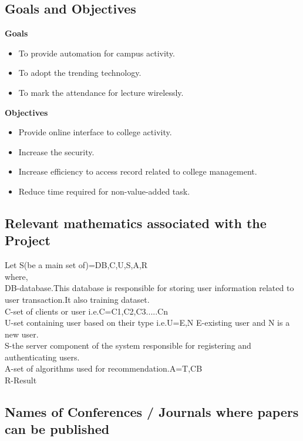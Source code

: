 \documentclass[10pt,a4paper]
{article}
\numberwithin{table}{section}
\begin{document}
{{\begin{normalsize}
\subsection{Goals and Objectives}
\hspace*{1cm}\textbf{Goals}
\begin{itemize}
\item To provide automation for campus activity.
\item To adopt the trending technology.
\item To mark the attendance for lecture wirelessly.
\end{itemize}
\hspace*{1cm}\textbf{Objectives}
\begin{itemize}
\item Provide online interface to college activity.
\item Increase the security.
\item Increase efficiency to access record related to college management.
\item Reduce time required for non-value-added task.
\end{itemize}

\subsection{Relevant mathematics associated with the Project}
Let S(be a main set of)=\textbraceleft DB,C,U,S,A,R\textbraceright\\
where,\\
DB-database.This database is responsible for storing user information related to user transaction.It also training dataset.\\
C-set of clients or user i.e.C=\textbraceleft C1,C2,C3.....Cn\textbraceright\\
U-set containing user based on their type i.e.U=\textbraceleft E,N  \textbraceright
E-existing user and N is a new user.\\
S-the server component of the system responsible for registering and authenticating users.\\
A-set of algorithms used for recommendation.A=\textbraceleft T,CB\textbraceright\\
R-Result

\subsection{Names of Conferences / Journals where papers can be published}


\end{normalsize}}}
\end{document}
